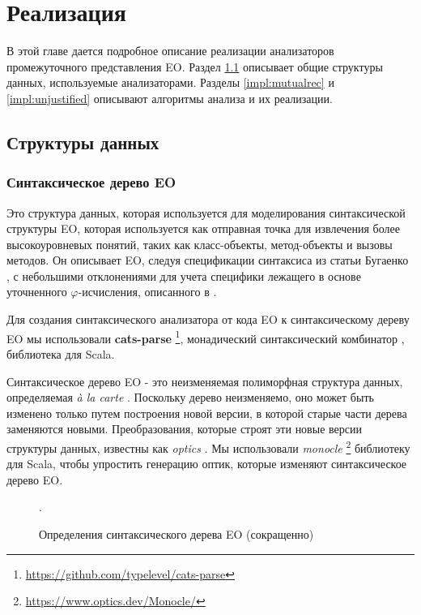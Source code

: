 \chapter{Реализация}
\label{chap:impl}
В этой главе дается подробное описание реализации анализаторов промежуточного представления EO. Раздел \ref{impl:data_structures} описывает общие структуры данных, используемые анализаторами. Разделы \ref{impl:mutualrec} и \ref{impl:unjustified} описывают алгоритмы анализа и их реализации.

\section{Структуры данных}
\label{impl:data_structures}

\subsection{Синтаксическое дерево EO}
Это структура данных, которая используется для моделирования синтаксической структуры EO, которая используется как отправная точка для извлечения более высокоуровневых понятий, таких как класс-объекты, метод-объекты и вызовы методов. Он описывает EO, следуя спецификации синтаксиса из статьи Бугаенко \cite{eolang}, с небольшими отклонениями для учета специфики лежащего в основе уточненного $\varphi$-исчисления, описанного в \cite{kudasov}. 

Для создания синтаксического анализатора от кода EO к синтаксическому дереву EO мы использовали \textbf{cats-parse} \footnote{\url{https://github.com/typelevel/cats-parse}}, монадический синтаксический комбинатор \cite{hill_combinators_1996}, библиотека для Scala.

Синтаксическое дерево EO - это неизменяемая полиморфная структура данных, определяемая \textit{à la carte} \cite{alacarte} . 
Поскольку дерево неизменяемо, оно может быть изменено только путем построения новой версии, в которой старые части дерева заменяются новыми. Преобразования, которые строят эти новые версии структуры данных, известны как \textit{optics} \cite{optics}. Мы использовали \textit{monocle} \footnote{\url{https://www.optics.dev/Monocle/}} библиотеку для Scala, чтобы упростить генерацию оптик, которые изменяют синтаксическое дерево EO.  

\begin{figure}
    
    \caption{Определения синтаксического дерева EO (сокращенно)}.
    \label{fig:ast}
\end{figure}

